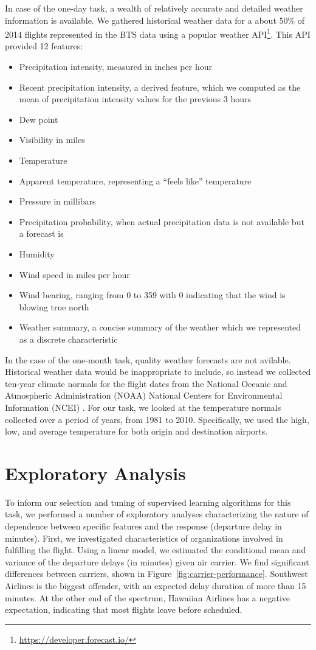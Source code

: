 \documentclass[twocolumn]{article}
\begin{document}
In case of the one-day task, a wealth of relatively accurate and detailed weather information is available. We gathered historical weather data for a about 50\% of 2014 flights represented in the BTS data using a popular weather API\footnote{\url{https://developer.forecast.io/}}. This API provided 12 features:
\begin{itemize}
\item Precipitation intensity, measured in inches per hour
\item Recent precipitation intensity, a derived feature, which we computed as the mean of precipitation intensity values for the previous 3 hours
\item Dew point
\item Visibility in miles
\item Temperature
\item Apparent temperature, representing a ``feels like'' temperature
\item Pressure in millibars
\item Precipitation probability, when actual precipitation data is not available but a forecast is
\item Humidity
\item Wind speed in miles per hour
\item Wind bearing, ranging from 0 to 359 with 0 indicating that the wind is blowing true north
\item Weather summary, a concise summary of the weather which we represented as a discrete characteristic
\end{itemize}

In the case of the one-month task, quality weather forecasts are not avilable. Historical weather data would be inappropriate to include, so instead we collected ten-year climate normals for the flight dates from the National Oceanic and Atmospheric Administration (NOAA) National Centers for Environmental Information (NCEI) \citep{noaaclimatedata}.  For our task, we looked at the temperature normals collected over a period of years, from 1981 to 2010. Specifically, we used the high, low, and average temperature for both origin and destination airports.

\section{Exploratory Analysis}
\label{sec:exploratory}

To inform our selection and tuning of supervised learning algorithms for this task, we performed a number of exploratory analyses characterizing the nature of dependence between specific features and the response (departure delay in minutes). First, we investigated characteristics of organizations involved in fulfilling the flight. Using a linear model, we estimated the conditional mean and variance of the departure delays (in minutes) given air carrier. We find significant differences between carriers, shown in Figure~\ref{fig:carrier-performance}. Southwest Airlines is the biggest offender, with an expected delay duration of more than 15 minutes. At the other end of the spectrum, Hawaiian Airlines has a negative expectation, indicating that most flights leave before scheduled.
\end{document}
